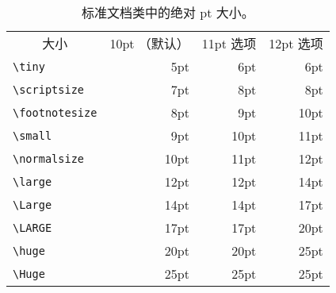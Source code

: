 \begin{table}[!tbp]
\caption{标准文档类中的绝对 pt 大小。}\label{tab:pointsizes}
\label{tab:sizes}
\begin{lined}{12cm}
\begin{tabular}{lrrr}
\multicolumn{1}{c}{大小} &
\multicolumn{1}{c}{10pt （默认）} &
           \multicolumn{1}{c}{11pt 选项}  &
           \multicolumn{1}{c}{12pt 选项}\\
\verb|\tiny|       & 5pt  & 6pt & 6pt\\
\verb|\scriptsize| & 7pt  & 8pt & 8pt\\
\verb|\footnotesize| & 8pt & 9pt & 10pt \\
\verb|\small|        & 9pt & 10pt & 11pt \\
\verb|\normalsize| & 10pt & 11pt & 12pt \\
\verb|\large|      & 12pt & 12pt & 14pt \\
\verb|\Large|      & 14pt & 14pt & 17pt \\
\verb|\LARGE|      & 17pt & 17pt & 20pt\\
\verb|\huge|       & 20pt & 20pt & 25pt\\
\verb|\Huge|       & 25pt & 25pt & 25pt\\
\end{tabular}

\bigskip
\end{lined}
\end{table}


